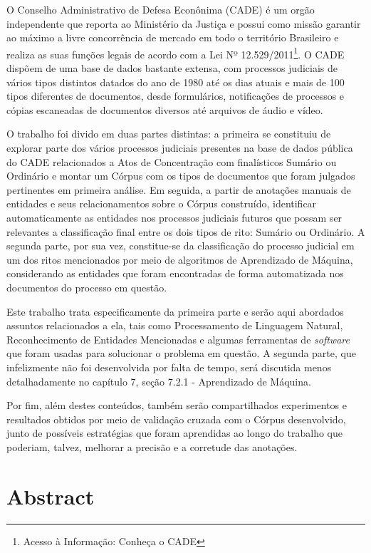 \documentclass[11pt]{report}
\begin{document}
\indent\indent O Conselho Administrativo de Defesa Econônima (CADE) é um orgão independente que reporta ao Ministério da Justiça e possui como missão garantir ao máximo a livre
concorrência de mercado em todo o território Brasileiro e realiza as suas funções legais de acordo com a Lei Nº 12.529/2011\footnote[1]{Acesso à Informação: Conheça o CADE}.
O CADE dispõem de uma base de dados bastante extensa, com processos judiciais de vários tipos distintos datados do ano de 1980 até os dias atuais e mais de 100 tipos diferentes de
documentos, desde formulários, notificações de processos e cópias escaneadas de documentos diversos até arquivos de áudio e vídeo.

O trabalho foi divido em duas partes distintas: a primeira se constituiu de explorar parte dos vários processos judiciais presentes na base de dados pública do CADE relacionados a Atos de
Concentração com finalísticos Sumário ou Ordinário e montar um Córpus com os tipos de documentos que foram julgados pertinentes em primeira análise. Em seguida, a partir de anotações
manuais de entidades e seus relacionamentos sobre o Córpus construído, identificar automaticamente as entidades nos processos judiciais futuros que possam ser relevantes a classificação
final entre os dois tipos de rito: Sumário ou Ordinário. A segunda parte, por sua vez, constitue-se da classificação do processo judicial em um dos ritos mencionados por meio de
algoritmos de Aprendizado de Máquina, considerando as entidades que foram encontradas de forma automatizada nos documentos do processo em questão.

Este trabalho trata especificamente da primeira parte e serão aqui abordados assuntos relacionados a ela, tais como Processamento de Linguagem Natural, Reconhecimento de Entidades
Mencionadas e algumas ferramentas de \textit{software} que foram usadas para solucionar o problema em questão. A segunda parte, que infelizmente não foi desenvolvida por falta de tempo,
será discutida menos detalhadamente no capítulo 7, seção 7.2.1 - Aprendizado de Máquina.

Por fim, além destes conteúdos, também serão compartilhados experimentos e resultados obtidos por meio de validação cruzada com o Córpus desenvolvido, junto de possíveis estratégias que
foram aprendidas ao longo do trabalho que poderiam, talvez, melhorar a precisão e a corretude das anotações.

\pagebreak
\thispagestyle{empty}
\chapter*{Abstract}
\end{document}
